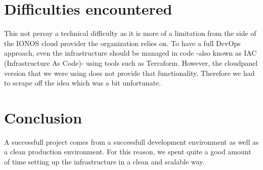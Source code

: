 \section{Difficulties encountered}
This not persay a technical difficulty as it is more of a limitation from the side of the IONOS cloud provider the organization relies on.
To have a full DevOps approach, even the infrastructure should be managed in code -also known as IAC (Infrastructure As Code)- using tools such as Terraform.
However, the cloudpanel version that we were using does not provide that functionality.
Therefore we had to scrape off the idea which was a bit unfortunate.

\setcounter{secnumdepth}{0} %
\section{Conclusion}
A successfull project comes from a successfull development environment as well as a clean production environment.
For this reason, we spent quite a good amount of time setting up the infrastructure in a clean and scalable way.
